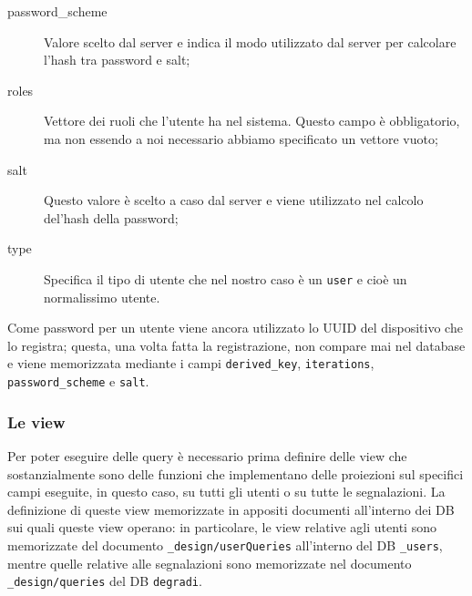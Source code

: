 \begin{description}
                    \item[password\_scheme] Valore scelto dal server e indica 
                    il modo utilizzato dal server per calcolare l'hash tra 
                    password e salt;
                    \item[roles] Vettore dei ruoli che l'utente ha nel 
                    sistema. Questo campo è obbligatorio, ma non essendo a noi
                    necessario abbiamo specificato un vettore vuoto;
                    \item[salt] Questo valore è scelto a caso dal server e 
                    viene utilizzato nel calcolo del'hash della password;
                    \item[type] Specifica il tipo di utente che nel nostro 
                    caso è un \texttt{user} e cioè un normalissimo utente. 
                \end{description}
                Come password per un utente viene ancora utilizzato lo UUID 
                del dispositivo che lo registra; questa, una volta fatta la 
                registrazione, non compare mai nel database e viene 
                memorizzata mediante i campi \texttt{derived\_key}, 
                \texttt{iterations}, \texttt{password\_scheme} e \texttt{salt}.
                
            \subsubsection{Le view}
                Per poter eseguire delle query è necessario prima definire 
                delle view che sostanzialmente sono delle funzioni che 
                implementano delle proiezioni sul specifici campi eseguite, in 
                questo caso, su tutti gli utenti o su tutte le segnalazioni.
                La definizione di queste view memorizzate in appositi 
                documenti all'interno dei DB sui quali queste view operano: in 
                particolare, le view relative agli utenti sono memorizzate del 
                documento \texttt{\_design/userQueries} all'interno del DB 
                \texttt{\_users}, mentre quelle relative alle segnalazioni 
                sono memorizzate nel documento \texttt{\_design/queries} del 
                DB \texttt{degradi}.
